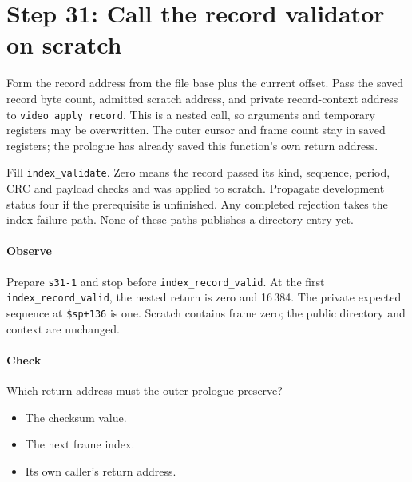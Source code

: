 \section{Step 31: Call the record validator on scratch}
Form the record address from the file base plus the current offset. Pass
the saved record byte count, admitted scratch address, and private record-context
address to \texttt{video\_apply\_record}. This is a nested call, so arguments
and temporary registers may be overwritten. The outer cursor and frame count
stay in saved registers; the prologue has already saved this function's own
return address.

Fill \texttt{index\_validate}. Zero means the record passed its kind, sequence,
period, CRC and payload checks and was applied to scratch. Propagate development
status four if the prerequisite is unfinished. Any completed rejection takes the
index failure path. None of these paths publishes a directory entry yet.

\paragraph{Observe} Prepare \texttt{s31-1} and stop before
\texttt{index\_record\_valid}. At the first \texttt{index\_record\_valid}, the nested return
is zero and 16\,384. The private expected sequence at \texttt{\$sp+136} is
one. Scratch contains frame zero; the public directory and context are unchanged.

\paragraph{Check} Which return address must the outer prologue preserve?
\begin{itemize}
  \item[A.] The checksum value.
  \item[B.] The next frame index.
  \item[C.] Its own caller's return address.
\end{itemize}
